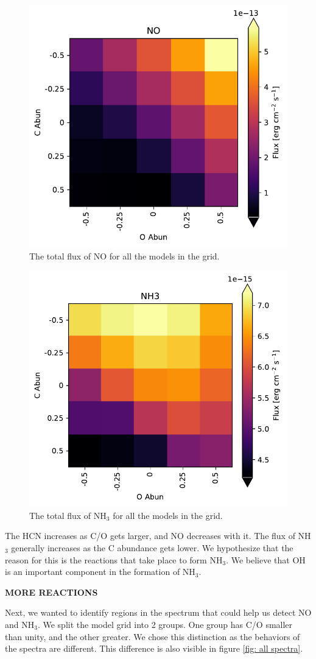 \documentclass[twoside, single, authoryear, semicolon]{lion-msc}
\newcommand{\4}{$_4$}
\newcommand{\3}{$_3$}
\newcommand{\2}{$_2$}
\begin{document}
\begin{figure}[!ht]
    \centering
    \includegraphics[width=0.5\linewidth]{Figures/NO_heatmap.pdf}
    \caption{The total flux of NO for all the models in the grid.}
    \label{fig: flux NO}
\end{figure}

\begin{figure}[!ht]
    \centering
    \includegraphics[width=0.5\linewidth]{Figures/NH3_heatmap.pdf}
    \caption{The total flux of NH\3 for all the models in the grid.}
    \label{fig: flux NH3}
\end{figure}

The HCN increases as C/O gets larger, and NO decreases with it. The flux of NH\3 generally increases as the C abundance gets lower. We hypothesize that the reason for this is the reactions that take place to form NH\3.
We believe that OH is an important component in the formation of NH\3.


\textbf{MORE REACTIONS}

Next, we wanted to identify regions in the spectrum that could help us detect NO and NH\3. We split the model grid into 2 groups. One group has C/O smaller than unity, and the other greater. We chose this distinction as the behaviors of the spectra are different. This difference is also visible in figure \ref{fig: all spectra}. 
\end{document}
